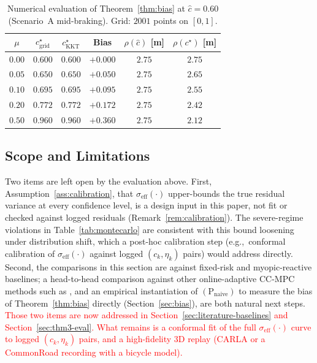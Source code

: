 \documentclass[letterpaper, 10 pt, conference]{ieeeconf}
\begin{document}
{\begin{table}[t]
\centering
\caption{Numerical evaluation of Theorem~\ref{thm:bias} at $\hat c=0.60$ (Scenario~A mid-braking). Grid: $2001$ points on $[0,1]$.}
\label{tab:bias}
\small
\setlength{\tabcolsep}{3.2pt}
\begin{tabular}{cccccc}
\toprule
$\mu$ & $c^\star_{\mathrm{grid}}$ & $c^\star_{\mathrm{KKT}}$ & Bias & $\rho(\hat c)$ [m] & $\rho(c^\star)$ [m] \\
\midrule
$0.00$ & $0.600$ & $0.600$ & $+0.000$ & $2.75$ & $2.75$ \\
$0.05$ & $0.650$ & $0.650$ & $+0.050$ & $2.75$ & $2.65$ \\
$0.10$ & $0.695$ & $0.695$ & $+0.095$ & $2.75$ & $2.55$ \\
$0.20$ & $0.772$ & $0.772$ & $+0.172$ & $2.75$ & $2.42$ \\
$0.50$ & $0.960$ & $0.960$ & $+0.360$ & $2.75$ & $2.12$ \\
\bottomrule
\end{tabular}
\end{table}
}

\subsection{Scope and Limitations}
\label{sec:limitations}

Two items are left open by the evaluation above. First, Assumption~\ref{ass:calibration},  that $\sigma_{\mathrm{eff}}(\cdot)$ upper-bounds the true residual variance at every confidence level,  is a design input in this paper, not fit or checked against logged residuals (Remark~\ref{rem:calibration}). The severe-regime violations in Table~\ref{tab:montecarlo} are consistent with this bound loosening under distribution shift, which a post-hoc calibration step (e.g.,\ conformal calibration of $\sigma_{\mathrm{eff}}(\cdot)$ against logged $(c_k,\eta_k)$ pairs) would address directly. Second, the comparisons in this section are against fixed-risk and myopic-reactive baselines; a head-to-head comparison against other online-adaptive CC-MPC methods such as \cite{ma2026sensor,engelaar2025stochastic}, and an empirical instantiation of $(\mathrm P_{\mathrm{naive}})$ to measure the bias of Theorem~\ref{thm:bias} directly (Section~\ref{sec:bias}), are both natural next steps.
\textcolor{red}{Those two items are now addressed in Section~\ref{sec:literature-baselines} and Section~\ref{sec:thm3-eval}. What remains is a conformal fit of the full $\sigma_{\mathrm{eff}}(\cdot)$ curve to logged $(c_k,\eta_k)$ pairs, and a high-fidelity 3D replay (CARLA or a CommonRoad recording with a bicycle model).}
\end{document}
